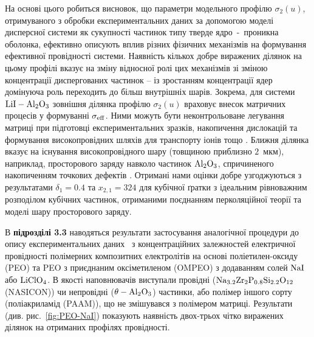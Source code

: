 \documentclass[twoside,a4paper,14pt]{vakaref}
\begin{document}
На основі цього робиться висновок, що  параметри модельного профілю $\sigma_2(u)$, отримуваного з обробки експериментальних даних за допомогою моделі дисперсної системи як сукупності частинок типу тверде ядро~-~проникна оболонка, ефективно описують вплив різних фізичних механізмів на формування ефективної провідності системи. Наявність кількох добре виражених ділянок на цьому профілі вказує на зміну відносної ролі цих механізмів зі зміною концентрації диспергованих частинок -- із зростанням концентрації ядер домінуюча роль переходить до більш внутрішніх шарів.
Зокрема, для системи $\rm LiI-Al_2O_3$ зовнішня ділянка профілю $\sigma_2(u)$ враховує внесок матричних процесів у формуванні $\sigma_{\rm eff}$. Ними можуть бути неконтрольоване легування матриці при підготовці експериментальних зразків, накопичення дислокацій та формування високопровідних шляхів для транспорту іонів тощо \cite{Dudney1989}. 
Ближня ділянка вказує на існування високопровідного шару (товщиною приблизно $2$~мкм), наприклад, просторового заряду навколо частинок $\rm Al_2O_3$, спричиненого накопиченням точкових дефектів \cite{Maier1985}. Отримані нами оцінки добре узгоджуються з результатами $\delta_1=0.4$ та $x_{2,1}=324$ \cite{Jiang1995b} для кубічної ґратки з ідеальним рівноважним розподілом кубічних частинок, отриманими поєднанням перколяційної теорії та моделі шару просторового заряду.

В {\bf підрозділі 3.3} наводяться результати застосування аналогічної процедури до опису експериментальних даних~\cite{Przl1995, Wiec1994} з концентраційних залежностей електричної провідності полімерних композитних електролітів на основі поліетилен-оксиду (PEO) та PEO з приєднаним оксіметиленом (OMPEO) з додаванням солей $\rm NaI$ або $\rm LiClO_4$. В якості наповнювачів виступали провідні ($\rm Na_{3.2}Zr_2P_{0.8}Si_{2.2}O_{12}$ (NASICON)) чи непровідні ($\rm \theta- Al_2O_3$) частинки, або полімер іншого сорту (поліакриламід (PAAM)), що не змішувався з полімером матриці. Результати (див. рис.~\ref{fig:PEO-NaI}) показують наявність двох-трьох чітко виражених ділянок на отриманих профілях провідності.
\end{document}
